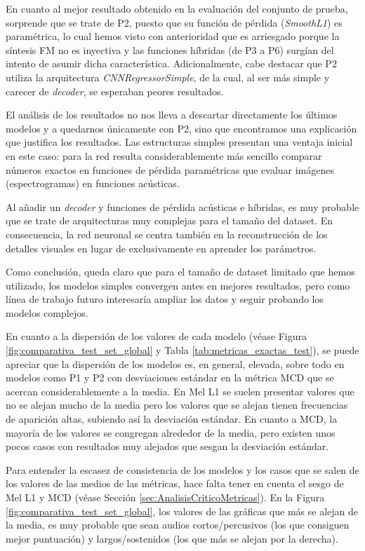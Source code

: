 En cuanto al mejor resultado obtenido en la evaluación del conjunto de prueba, sorprende que se trate de P2, puesto que su función de pérdida (\textit{SmoothL1}) es paramétrica, lo cual hemos visto con anterioridad que es arriesgado porque la síntesis FM no es inyectiva y las funciones híbridas (de P3 a P6) surgían del intento de asumir dicha característica. Adicionalmente, cabe destacar que P2 utiliza la arquitectura \textit{CNNRegressorSimple}, de la cual, al ser más simple y carecer de \textit{decoder}, se esperaban peores resultados.

El análisis de los resultados no nos lleva a descartar directamente los últimos modelos y a quedarnos únicamente con P2, sino que encontramos una explicación que justifica los resultados. Las estructuras simples presentan una ventaja inicial en este caso: para la red resulta considerablemente más sencillo comparar números exactos en funciones de pérdida paramétricas que evaluar imágenes (espectrogramas) en funciones acústicas.

Al añadir un \textit{decoder} y funciones de pérdida acústicas e híbridas, es muy probable que se trate de arquitecturas muy complejas para el tamaño del dataset. En consecuencia, la red neuronal se centra también en la reconstrucción de los detalles visuales en lugar de exclusivamente en aprender los parámetros. 

Como conclusión, queda claro que para el tamaño de dataset limitado que hemos utilizado, los modelos simples convergen antes en mejores resultados, pero como línea de trabajo futuro interesaría ampliar los datos y seguir probando los modelos complejos.

En cuanto a la dispersión de los valores de cada modelo (véase Figura \ref{fig:comparativa_test_set_global} y Tabla \ref{tab:metricas_exactas_test}), se puede apreciar que la dispersión de los modelos es, en general, elevada, sobre todo en modelos como P1 y P2 con desviaciones estándar en la métrica MCD que se acercan considerablemente a la media. En Mel L1 se suelen presentar valores que no se alejan mucho de la media pero los valores que se alejan tienen frecuencias de aparición altas, subiendo  así la desviación estándar. En cuanto a MCD, la mayoría de los valores se congregan alrededor de la media, pero existen unos pocos casos con resultados muy alejados que sesgan la desviación estándar. 

Para entender la escasez de consistencia de los modelos y los casos que se salen de los valores de las medios de las métricas, hace falta tener en cuenta el sesgo de Mel L1 y MCD (véase Sección \ref{sec:AnalisisCriticoMetricas}). En la Figura \ref{fig:comparativa_test_set_global}, los valores de las gráficas que más se alejan de la media, es muy probable que sean audios cortos/percusivos (los que consiguen mejor puntuación) y largos/sostenidos (los que más se alejan por la derecha).

